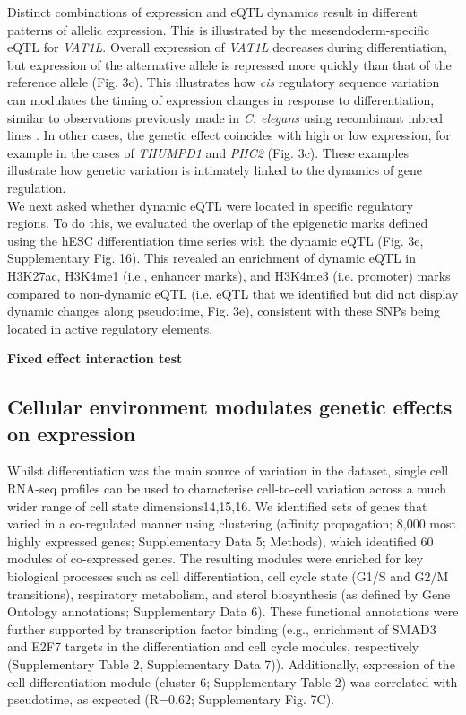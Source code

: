 Distinct combinations of expression and eQTL dynamics result in different patterns of allelic expression. This is illustrated by the mesendoderm-specific eQTL for \textit{VAT1L}. 
Overall expression of \textit{VAT1L} decreases during differentiation, but expression of the alternative allele is repressed more quickly than that of the reference allele (Fig. 3c). 
This illustrates how \textit{cis} regulatory sequence variation can modulates the timing of expression changes in response to differentiation, similar to observations previously made in \textit{C. elegans} using recombinant inbred lines \cite{francesconi2014effects}. 
In other cases, the genetic effect coincides with high or low expression, for example in the cases of \textit{THUMPD1} and \textit{PHC2} (Fig. 3c). 
These examples illustrate how genetic variation is intimately linked to the dynamics of gene regulation.\\

We next asked whether dynamic eQTL were located in specific regulatory regions. 
To do this, we evaluated the overlap of the epigenetic marks defined using the hESC differentiation time series with the dynamic eQTL (Fig. 3e, Supplementary Fig. 16). 
This revealed an enrichment of dynamic eQTL in H3K27ac, H3K4me1 (i.e., enhancer marks), and H3K4me3 (i.e. promoter) marks compared to non-dynamic eQTL (i.e. eQTL that we identified but did not display dynamic changes along pseudotime, Fig. 3e), consistent with these SNPs being located in active regulatory elements.

\vspace{5mm}

\textbf{Fixed effect interaction test}



\subsection{Cellular environment modulates genetic effects on expression}

Whilst differentiation was the main source of variation in the dataset, single cell RNA-seq profiles can be used to characterise cell-to-cell variation across a much wider range of cell state dimensions14,15,16. 
We identified sets of genes that varied in a co-regulated manner using clustering (affinity propagation; 8,000 most highly expressed genes; Supplementary Data 5; Methods), which identified 60 modules of co-expressed genes. 
The resulting modules were enriched for key biological processes such as cell differentiation, cell cycle state (G1/S and G2/M transitions), respiratory metabolism, and sterol biosynthesis (as defined by Gene Ontology annotations; Supplementary Data 6). 
These functional annotations were further supported by transcription factor binding (e.g., enrichment of SMAD3 and E2F7 targets in the differentiation and cell cycle modules, respectively (Supplementary Table 2, Supplementary Data 7)). 
Additionally, expression of the cell differentiation module (cluster 6; Supplementary Table 2) was correlated with pseudotime, as expected (R=0.62; Supplementary Fig. 7C).\\

